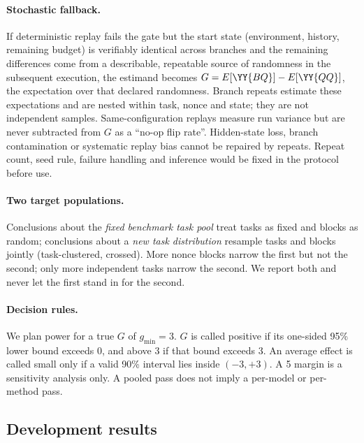 \paragraph{Stochastic fallback.} If deterministic replay fails the gate but the start state (environment, history, remaining budget) is verifiably identical across branches and the remaining differences come from a describable, repeatable source of randomness in the subsequent execution, the estimand becomes $G=E[\YY{BQ}]-E[\YY{QQ}]$, the expectation over that declared randomness. Branch repeats estimate these expectations and are nested within task, nonce and state; they are not independent samples. Same-configuration replays measure run variance but are never subtracted from $G$ as a ``no-op flip rate''. Hidden-state loss, branch contamination or systematic replay bias cannot be repaired by repeats. Repeat count, seed rule, failure handling and inference would be fixed in the protocol before use.

\paragraph{Two target populations.} Conclusions about the \emph{fixed benchmark task pool} treat tasks as fixed and blocks as random; conclusions about a \emph{new task distribution} resample tasks and blocks jointly (task-clustered, crossed). More nonce blocks narrow the first but not the second; only more independent tasks narrow the second. We report both and never let the first stand in for the second.

\paragraph{Decision rules.} We plan power for a true $G$ of $g_{\min}=3$\pp{}. $G$ is called positive if its one-sided 95\% lower bound exceeds 0, and above 3\pp{} if that bound exceeds 3\pp{}. An average effect is called small only if a valid 90\% interval lies inside $(-3,+3)$\pp{}. A 5\pp{} margin is a sensitivity analysis only. A pooled pass does not imply a per-model or per-method pass. 

\subsection{Development results}
\label{sec:fork-results}


